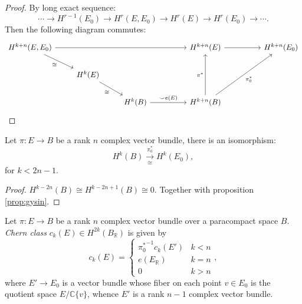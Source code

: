 \documentclass[11pt]{homework}
\begin{document}
\begin{proof}
    By long exact sequence:
    \begin{equation*}
        \cdots \rightarrow H^{r-1}(E_0) \rightarrow H^{r}(E, E_0) \rightarrow H^{r}(E) \rightarrow H^{r}(E_0) \rightarrow \cdots.
    \end{equation*}
    Then the following diagram commutes:
    \[\begin{tikzcd}
        {H^{k+n}(E,E_0)} &&&& {H^{k+n}(E)} && {H^{k+n}(E_0)} \\
        & {H^k(E)} &&& {} \\
        && {H^k(B)} && {H^{k+n}(B)}
        \arrow["{\pi_0^*}"', from=3-5, to=1-7]
        \arrow[from=1-5, to=1-7]
        \arrow["{\pi^*}", from=3-5, to=1-5]
        \arrow["{\smile e(E)}", from=3-3, to=3-5]
        \arrow[from=1-1, to=1-5]
        \arrow["\cong"', from=2-2, to=3-3]
        \arrow["\cong"', from=1-1, to=2-2]
    \end{tikzcd}\]
\end{proof}

\begin{corollary}
    Let $\pi : E\to B$ be a rank $n$ complex vector bundle, there is an isomorphism:
    \begin{equation*}
        H^{k}(B) \xrightarrow[\cong]{\pi_0^*} H^{k}(E_0),
    \end{equation*}
    for $k<2n-1$.
\end{corollary}
\begin{proof}
    $H^{k-2n}(B) \cong H^{k-2n+1}(B) \cong 0$. Together with proposition \ref{prop:gysin}.
\end{proof}

\begin{definition}
    Let $\pi : E\to B$ be a rank $n$ complex vector bundle over a paracompact space $B$. \textit{Chern class} $c_{k}(E) \in H^{2k}(B_{\mathbb {R}})$ is given by
    \begin{equation*}
        c_{k}(E)=\begin{cases}
            {\pi_0^{*}}^{-1}c_{k}(E')&k<n\\
            e(E_{\mathbb {R} })&k=n\\
            0&k>n
        \end{cases},
    \end{equation*}
    where $E' \rightarrow E_0$ is a vector bundle whose fiber on each point $v\in E_0$ is the quotient space $E / \mathbb{C}\{v\}$, whence $E'$ is a rank $n-1$ complex vector bundle.
\end{definition}
\end{document}

